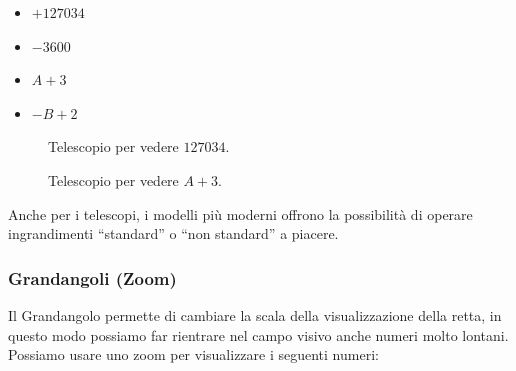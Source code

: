 \begin{multicols}{4}
\begin{itemize}[nosep]
 \item $+127034$
 \item $-3600$
 \item $A+3$
 \item $-B+2$
\end{itemize}
\end{multicols}
\vspace{-5mm}
\begin{figure}[h]
\begin{inaccessibleblock}

\begin{minipage}{.48\linewidth}
 \begin{center}
\scalebox{0.8}{\telescopioa}
 \end{center}
\caption{Telescopio per vedere \(127034\).} \label{fig:telescopioa}
\end{minipage}
\hfill
\begin{minipage}{.48\linewidth}
 \begin{center}
\scalebox{0.8}{\telescopiob}
 \end{center}
\caption{Telescopio per vedere \(A+3\).} \label{fig:telescopiob}
\end{minipage}

\end{inaccessibleblock}
\end{figure}

Anche per i telescopi, i modelli più moderni offrono la possibilità di 
operare 
ingrandimenti ``standard'' o ``non standard'' a piacere.

\subsubsection{Grandangoli (Zoom)}
\label{subsec:insnum_zoom}

Il Grandangolo permette di cambiare la scala della visualizzazione della 
retta, 
in questo modo possiamo far rientrare nel campo visivo anche numeri molto 
lontani.
Possiamo usare uno zoom per visualizzare i seguenti numeri:

